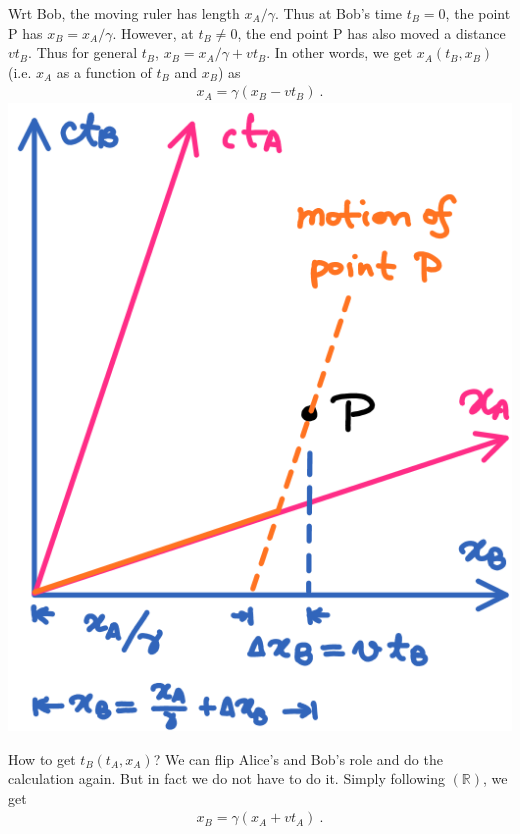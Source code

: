 {{		Wrt Bob, the moving ruler has length $x_A/\gamma$. Thus at Bob's time $t_B=0$, the point P has $x_B=x_A / \gamma$. However, at $t_B\neq 0$, the end point P has also moved a distance $v t_B$. Thus for general $t_B$, $x_B = x_A/\gamma + v t_B$. In other words, we get $x_A(t_B, x_B)$ (i.e. $x_A$ as a function of $t_B$ and $x_B$) as
		\begin{align}
			\label{eq:st_space}
			x_A = \gamma \left ( x_B - v t_B \right )~.
		\end{align}
	}{
		\includegraphics[width=\textwidth]{st_space_trans}
	}
	
	\tcblower

	How to get $t_B (t_A, x_A)$? We can flip Alice's and Bob's role and do the calculation again. But in fact we do not have to do it. Simply following $(\mathbb{R})$, we get
	\begin{align}
		\label{eq:st_space_r}
		x_B = \gamma \left ( x_A + v t_A \right )~.
	\end{align}
}

